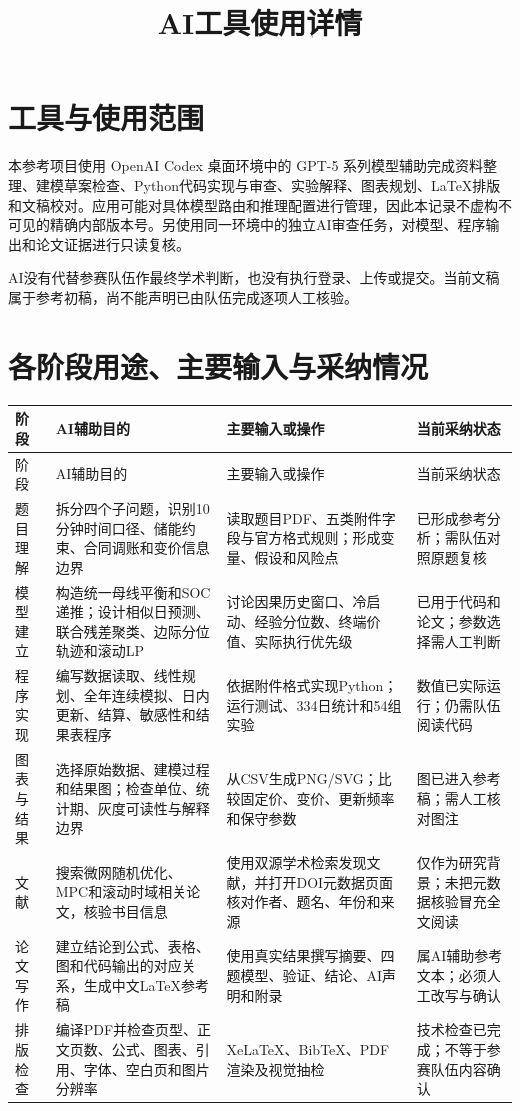 \documentclass[UTF8,11pt,a4paper]{ctexart}
\title{AI工具使用详情}
\author{}
\date{}
\begin{document}
\maketitle

\section{工具与使用范围}

本参考项目使用 OpenAI Codex 桌面环境中的 GPT-5 系列模型辅助完成资料整理、建模草案检查、Python代码实现与审查、实验解释、图表规划、LaTeX排版和文稿校对。应用可能对具体模型路由和推理配置进行管理，因此本记录不虚构不可见的精确内部版本号。另使用同一环境中的独立AI审查任务，对模型、程序输出和论文证据进行只读复核。

AI没有代替参赛队伍作最终学术判断，也没有执行登录、上传或提交。当前文稿属于参考初稿，尚不能声明已由队伍完成逐项人工核验。

\section{各阶段用途、主要输入与采纳情况}

\begin{longtable}{p{2.2cm}p{4.2cm}p{4.6cm}p{3.0cm}}
\toprule
阶段 & AI辅助目的 & 主要输入或操作 & 当前采纳状态\\
\midrule
\endfirsthead
\toprule
阶段 & AI辅助目的 & 主要输入或操作 & 当前采纳状态\\
\midrule
\endhead
题目理解 & 拆分四个子问题，识别10分钟时间口径、储能约束、合同调账和变价信息边界 & 读取题目PDF、五类附件字段与官方格式规则；形成变量、假设和风险点 & 已形成参考分析；需队伍对照原题复核\\
模型建立 & 构造统一母线平衡和SOC递推；设计相似日预测、联合残差聚类、边际分位轨迹和滚动LP & 讨论因果历史窗口、冷启动、经验分位数、终端价值、实际执行优先级 & 已用于代码和论文；参数选择需人工判断\\
程序实现 & 编写数据读取、线性规划、全年连续模拟、日内更新、结算、敏感性和结果表程序 & 依据附件格式实现Python；运行测试、334日统计和54组实验 & 数值已实际运行；仍需队伍阅读代码\\
图表与结果 & 选择原始数据、建模过程和结果图；检查单位、统计期、灰度可读性与解释边界 & 从CSV生成PNG/SVG；比较固定价、变价、更新频率和保守参数 & 图已进入参考稿；需人工核对图注\\
文献 & 搜索微网随机优化、MPC和滚动时域相关论文，核验书目信息 & 使用双源学术检索发现文献，并打开DOI元数据页面核对作者、题名、年份和来源 & 仅作为研究背景；未把元数据核验冒充全文阅读\\
论文写作 & 建立结论到公式、表格、图和代码输出的对应关系，生成中文LaTeX参考稿 & 使用真实结果撰写摘要、四题模型、验证、结论、AI声明和附录 & 属AI辅助参考文本；必须人工改写与确认\\
排版检查 & 编译PDF并检查页型、正文页数、公式、图表、引用、字体、空白页和图片分辨率 & XeLaTeX、BibTeX、PDF渲染及视觉抽检 & 技术检查已完成；不等于参赛队伍内容确认\\
\bottomrule
\end{longtable}
\end{document}
